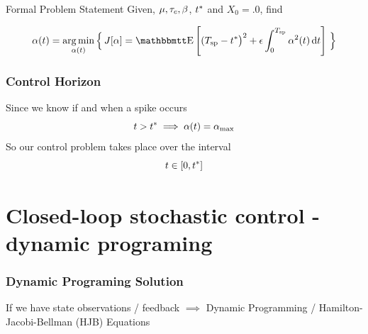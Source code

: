 \documentclass{beamer}
\begin{document}
\begin{frame}

\begin{block}{Formal Problem Statement}
Given, ${\mu }, { \tau_{c} }, {\beta}$, ${ t^* }$ and $X_0 = .0$, find

\begin{equation}
\a(t) = \argmin_{\a(t)} \Big\{ \, J[\a] = 
\Exp\left[
(\ts - \T \big)^2 
+  
\e \int_0^\ts  \a^2(t) \intd{t}  \right]
\, \Big\}
\end{equation}
\end{block}
\end{frame}

\begin{frame}
\frametitle{Control Horizon}
Since we know if and when a spike occurs
$$
t>{ t^* } \implies {\alpha}(t) = { {\alpha}_{\textrm{max}} }
$$ 
So our control problem takes place over the interval
$$  t \in [0 , { t^* }] $$ 
\end{frame}

 
\section{Closed-loop stochastic control - dynamic programing}
\begin{frame}
\frametitle{Dynamic Programing Solution}
If we have state observations / feedback
\vskip2pt
$\implies$ Dynamic Programming /
Hamilton-Jacobi-Bellman (HJB) Equations
\vskip 1pt
\end{frame} 
\end{document}
